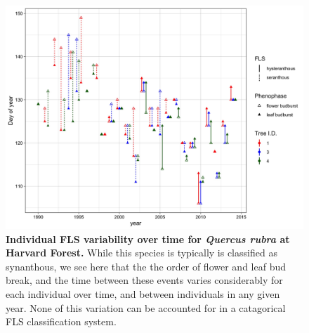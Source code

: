\documentclass[12pt]{article}\usepackage[]{graphicx}\usepackage[]{color}
\begin{document}
 \begin{figure}[ht]
        \centering
          \includegraphics[width=\textwidth]{..//figure/HF_Q_ru_interannual.jpeg}
        \caption{\textbf{Individual FLS variability over time for \textit{Quercus rubra} at Harvard Forest.} While this species is typically is classified as synanthous, we see here that the the order of flower and leaf bud break, and the time between these events varies considerably for each individual over time, and between individuals in any given year. None of this variation can be accounted for in a catagorical FLS classification system.}
        \label{fig: Figure 3}
    \end{figure}
  
\end{document}
